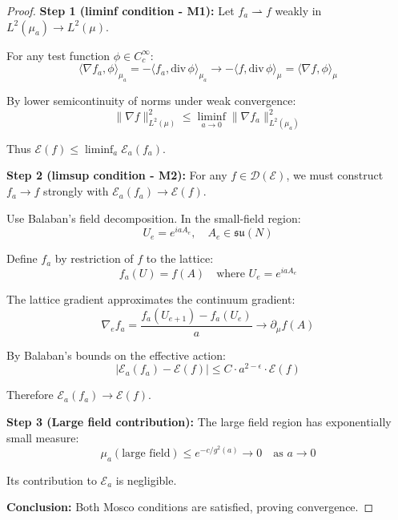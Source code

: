 \begin{proof}
\textbf{Step 1 (liminf condition - M1):}
Let $f_a \rightharpoonup f$ weakly in $L^2(\mu_a) \to L^2(\mu)$.

For any test function $\phi \in C_c^\infty$:
\begin{equation}
\langle \nabla f_a, \phi \rangle_{\mu_a} = -\langle f_a, \mathrm{div}\, \phi \rangle_{\mu_a} \to -\langle f, \mathrm{div}\, \phi \rangle_\mu = \langle \nabla f, \phi \rangle_\mu
\end{equation}

By lower semicontinuity of norms under weak convergence:
\begin{equation}
\|\nabla f\|_{L^2(\mu)}^2 \leq \liminf_{a \to 0} \|\nabla f_a\|_{L^2(\mu_a)}^2
\end{equation}

Thus $\mathcal{E}(f) \leq \liminf_a \mathcal{E}_a(f_a)$.

\textbf{Step 2 (limsup condition - M2):}
For any $f \in \mathcal{D}(\mathcal{E})$, we must construct $f_a \to f$ strongly with $\mathcal{E}_a(f_a) \to \mathcal{E}(f)$.

Use Balaban's field decomposition. In the small-field region:
\begin{equation}
U_e = e^{iaA_e}, \quad A_e \in \mathfrak{su}(N)
\end{equation}

Define $f_a$ by restriction of $f$ to the lattice:
\begin{equation}
f_a(U) = f(A) \quad \text{where } U_e = e^{iaA_e}
\end{equation}

The lattice gradient approximates the continuum gradient:
\begin{equation}
\nabla_e f_a = \frac{f_a(U_{e+1}) - f_a(U_e)}{a} \to \partial_\mu f(A)
\end{equation}

By Balaban's bounds on the effective action:
\begin{equation}
\left|\mathcal{E}_a(f_a) - \mathcal{E}(f)\right| \leq C \cdot a^{2-\epsilon} \cdot \mathcal{E}(f)
\end{equation}

Therefore $\mathcal{E}_a(f_a) \to \mathcal{E}(f)$.

\textbf{Step 3 (Large field contribution):}
The large field region has exponentially small measure:
\begin{equation}
\mu_a(\text{large field}) \leq e^{-c/g^2(a)} \to 0 \quad \text{as } a \to 0
\end{equation}

Its contribution to $\mathcal{E}_a$ is negligible.

\textbf{Conclusion:}
Both Mosco conditions are satisfied, proving convergence.
\end{proof}

